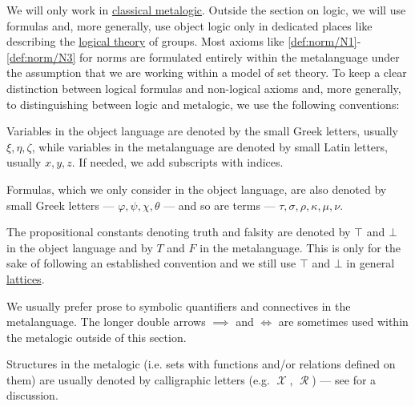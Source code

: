 \begin{remark}\label{rem:mathematical_logic_conventions}
  We will only work in \hyperref[def:propositional_derivation_system]{classical metalogic}. Outside the section on logic, we will use formulas and, more generally, use object logic only in dedicated places like  describing the \hyperref[def:first_order_theory]{logical theory} of groups. Most axioms like \ref{def:norm/N1}-\ref{def:norm/N3} for norms are formulated entirely within the metalanguage under the assumption that we are working within a model of set theory. To keep a clear distinction between logical formulas and non-logical axioms and, more generally, to distinguishing between logic and metalogic, we use the following conventions:

  \begin{thmenum}
     Variables in the object language are denoted by the small Greek letters, usually \( \xi, \eta, \zeta \), while variables in the metalanguage are denoted by small Latin letters, usually \( x, y, z \). If needed, we add subscripts with indices.

     Formulas, which we only consider in the object language, are also denoted by small Greek letters --- \( \varphi, \psi, \chi, \theta \) --- and so are terms --- \( \tau, \sigma, \rho, \kappa, \mu, \nu \).

     The propositional constants denoting truth and falsity are denoted by \( \top \) and \( \bot \) in the object language and by \( T \) and \( F \) in the metalanguage. This is only for the sake of following an established convention and we still use \( \top \) and \( \bot \) in general \hyperref[def:semilattice/lattice]{lattices}.

     We usually prefer prose to symbolic quantifiers and connectives in the metalanguage. The longer double arrows \( \implies \) and \( \iff \) are sometimes used within the metalogic outside of this section.

     Structures in the metalogic (i.e. sets with functions and/or relations defined on them) are usually denoted by calligraphic letters (e.g. \( \mscrX \), \( \mscrR \)) --- see  for a discussion.


\end{thmenum}
\end{remark}
